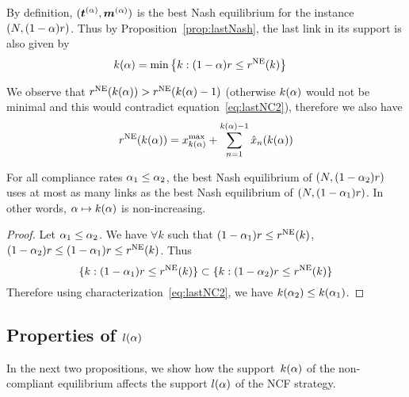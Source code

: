 By definition, $(\boldsymbol {t}^{(\alpha)}, \boldsymbol {m}^{(\alpha)})$ is the best Nash equilibrium for the instance $(N, (1-\alpha)r)$. Thus by Proposition~\ref{prop:lastNash}, the last link in its support is also given by
\begin{align}
k(\alpha)
& = \min \left\{k: (1-\alpha)r \leq r^{\textup{NE}} ( k ) \right\}
\label{eq:lastNC2}
\end{align}

\begin{remark}
\label{rem:max}
We observe that $r^{\textup{NE}} ( k(\alpha) ) > r^{\textup{NE}} ( k(\alpha) - 1 )$ (otherwise $k(\alpha)$ would not be minimal and this would contradict equation~\eqref{eq:lastNC2}), therefore we also have
\begin{equation}
r^{\textup{NE}} ( k(\alpha) ) = x^{\max}_{k(\alpha)} + \sum_{n=1}^{k(\alpha)-1} \hat{x}_{n} ( k(\alpha) )\end{equation}
\end{remark}

\begin{proposition}
\label{prop:lastNC_decreasing}
For all compliance rates $\alpha_1 \leq \alpha_2$, the best Nash equilibrium of ${ (N,(1-\alpha_2)r) }$ uses at most as many links as the best Nash equilibrium of ${ (N, (1-\alpha_1)r) }$. In other words, $\alpha \mapsto k(\alpha)$ is non-increasing.
\end{proposition}

\begin{proof}
Let $\alpha_1 \leq \alpha_2$. We have $\forall k$ such that $(1-\alpha_1)r \leq r^{\textup{NE}} ( k )$, $(1-\alpha_2)r \leq (1-\alpha_1)r \leq r^{\textup{NE}} ( k ) $. Thus
\[
\{k: (1-\alpha_1)r \leq r^{\textup{NE}} ( k )\} \subset \{k: (1-\alpha_2)r \leq r^{\textup{NE}} ( k )\}
\] 
Therefore using characterization~\eqref{eq:lastNC2}, we have $ k(\alpha_2) \leq k(\alpha_1)$.
\end{proof}

\subsection{Properties of $l(\alpha)$}

In the next two propositions, we show how the support~$k(\alpha)$ of the non-compliant equilibrium affects the support $l(\alpha)$ of the NCF strategy.

